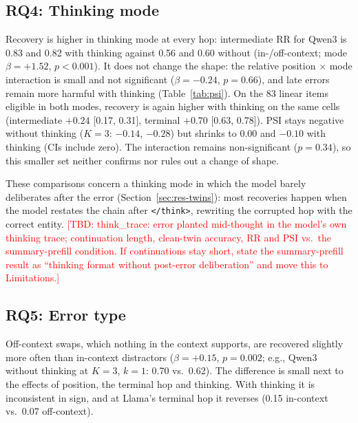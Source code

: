 \documentclass[conference]{IEEEtran}
\newcommand{\tbd}[1]{\textcolor{red}{[TBD: #1]}}
\newcommand{\RR}{\mathrm{RR}}
\newcommand{\PSI}{\mathrm{PSI}}
\begin{document}
\subsection{RQ4: Thinking mode}
\label{sec:res-thinking}
Recovery is higher in thinking mode at every hop: intermediate $\RR$ for Qwen3 is 0.83 and 0.82 with thinking against 0.56 and 0.60 without (in-/off-context; mode $\beta=+1.52$, $p<0.001$). It does not change the shape: the relative position $\times$ mode interaction is small and not significant ($\beta=-0.24$, $p=0.66$), and late errors remain more harmful with thinking (Table~\ref{tab:psi}). On the 83 linear items eligible in both modes, recovery is again higher with thinking on the same cells (intermediate $+0.24$ [0.17, 0.31], terminal $+0.70$ [0.63, 0.78]). $\PSI$ stays negative without thinking ($K{=}3$: $-0.14$, $-0.28$) but shrinks to $0.00$ and $-0.10$ with thinking (CIs include zero). The interaction remains non-significant ($p=0.34$), so this smaller set neither confirms nor rules out a change of shape.

These comparisons concern a thinking mode in which the model barely deliberates after the error (Section~\ref{sec:res-twins}): most recoveries happen when the model restates the chain after \texttt{</think>}, rewriting the corrupted hop with the correct entity. \tbd{think\_trace: error planted mid-thought in the model's own thinking trace; continuation length, clean-twin accuracy, $\RR$ and $\PSI$ vs.\ the summary-prefill condition. If continuations stay short, state the summary-prefill result as ``thinking format without post-error deliberation'' and move this to Limitations.}

\subsection{RQ5: Error type}
Off-context swaps, which nothing in the context supports, are recovered slightly more often than in-context distractors ($\beta=+0.15$, $p=0.002$; e.g., Qwen3 without thinking at $K{=}3$, $k{=}1$: 0.70 vs.\ 0.62). The difference is small next to the effects of position, the terminal hop and thinking. With thinking it is inconsistent in sign, and at Llama's terminal hop it reverses (0.15 in-context vs.\ 0.07 off-context).
\end{document}
